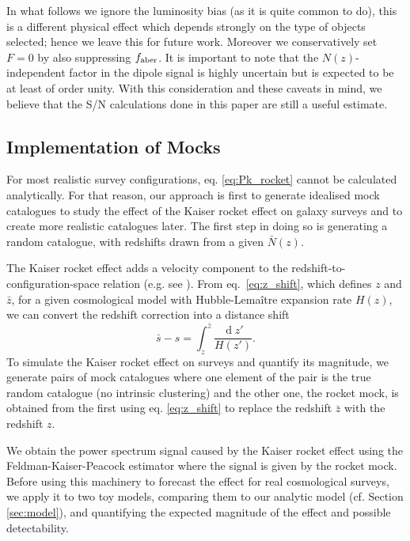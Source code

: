 \documentclass[a4paper,11pt]{article}
\renewcommand{\d}{\operatorname{d}}
\begin{document}
 In what follows we ignore the luminosity bias (as it is quite common to do), this is a different physical effect  which depends strongly on the type of objects selected; hence we leave  this for future work. Moreover we conservatively set $F=0$ by also suppressing $f_{\rm aber}$. It is important to note that the $N(z)$-independent factor in the dipole signal is highly uncertain but is expected to be at least of order unity.
 With this consideration  and these caveats in mind, we believe that the S/N calculations done in this paper are still a useful estimate.
 
\subsection{Implementation of Mocks}
\label{sec:mocks}

For most realistic survey configurations, eq. \eqref{eq:Pk_rocket} cannot be calculated analytically. For that reason, our approach is first to generate idealised mock catalogues to study the effect of the Kaiser rocket effect on galaxy surveys and to create more realistic catalogues later. The first step in doing so is generating  a random catalogue, with redshifts drawn from a given  $\bar N(z)$.

The Kaiser rocket effect adds a velocity component to the redshift-to-configuration-space relation (e.g. see \cite{Bertacca:2019wyg}).
From eq.~\eqref{eq:z_shift}, which defines $z$ and $\bar{z}$,
for a given cosmological model with Hubble-Lemaître  expansion rate $H(z)$, we can convert  the redshift correction into a distance shift 
\begin{equation}
    \bar s - {s} = \int_{{z}}^{\bar z}\frac{\d z'}{H(z')}.
\end{equation}
To simulate the Kaiser rocket effect on surveys and quantify its magnitude, we generate pairs of mock catalogues where one element of the pair is the true random catalogue (no intrinsic clustering) and the other one, the rocket mock, is obtained from the first using eq. \eqref{eq:z_shift} to replace the redshift $\bar z$ with the redshift $z$.

We obtain the power spectrum signal caused by the Kaiser rocket effect using the Feldman-Kaiser-Peacock estimator \cite[FKP]{Feldman:1993ky} where the signal is given by the rocket mock. Before using this machinery to forecast the effect for real cosmological surveys, we apply it to two toy models, comparing them to our analytic model (cf. Section \ref{sec:model}), and quantifying the expected magnitude of the effect and possible detectability.
\end{document}

